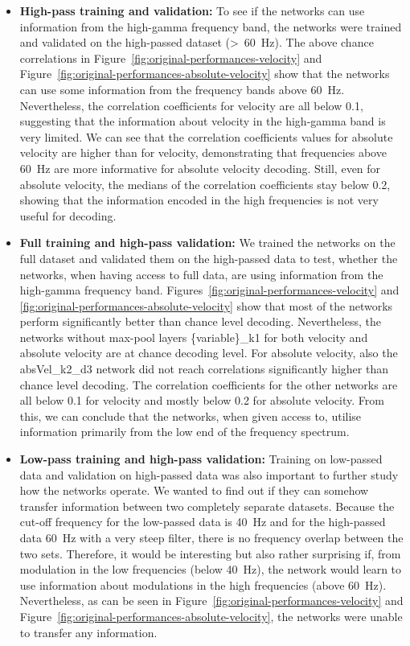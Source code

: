 \begin{itemize}
    \item \textbf{High-pass training and validation:} To see if the networks can use information from the high-gamma frequency band, the networks were trained and validated on the high-passed dataset (>~60~Hz).
    The above chance correlations in Figure~\ref{fig:original-performances-velocity} and Figure~\ref{fig:original-performances-absolute-velocity} show that the networks can use some information from the frequency bands above 60~Hz. 
    Nevertheless, the correlation coefficients for velocity are all below 0.1, suggesting that the information about velocity in the high-gamma band is very limited.
    We can see that the correlation coefficients values for absolute velocity are higher than for velocity, demonstrating that frequencies above 60~Hz are more informative for absolute velocity decoding.
    Still, even for absolute velocity, the medians of the correlation coefficients stay below 0.2, showing that the information encoded in the high frequencies is not very useful for decoding.
    
    \item \textbf{Full training and high-pass validation:} We trained the networks on the full dataset and validated them on the high-passed data to test, whether the networks, when having access to full data, are using information from the high-gamma frequency band.
    Figures~\ref{fig:original-performances-velocity} and \ref{fig:original-performances-absolute-velocity} show that most of the networks perform significantly better than chance level decoding.
    Nevertheless, the networks without max-pool layers \{variable\}\_k1 for both velocity and absolute velocity are at chance decoding level. For absolute velocity, also the absVel\_k2\_d3 network did not reach correlations significantly higher than chance level decoding. 
    The correlation coefficients for the other networks are all below 0.1 for velocity and mostly below 0.2 for absolute velocity.
    From this, we can conclude that the networks, when given access to, utilise information primarily from the low end of the frequency spectrum.
    \item \textbf{Low-pass training and high-pass validation:}
    Training on low-passed data and validation on high-passed data was also important to further study how the networks operate.
    We wanted to find out if they can somehow transfer information between two completely separate datasets.
    Because the cut-off frequency for the low-passed data is 40~Hz and for the high-passed data 60~Hz with a very steep filter, there is no frequency overlap between the two sets.
    Therefore, it would be interesting but also rather surprising if, from modulation in the low frequencies (below 40~Hz), the network would learn to use information about modulations in the high frequencies (above 60~Hz).
    Nevertheless, as can be seen in Figure~\ref{fig:original-performances-velocity} and Figure~\ref{fig:original-performances-absolute-velocity}, the networks were unable to transfer any information.
    

\end{itemize}
